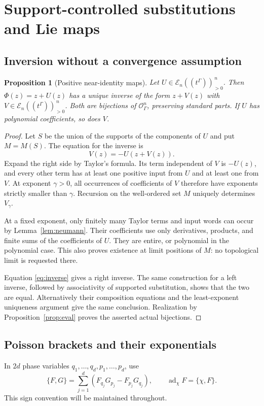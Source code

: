 \documentclass[11pt,letterpaper]{article}
\numberwithin{equation}{section}
\newtheorem{proposition}[theorem]{Proposition}
\theoremstyle{definition}
\theoremstyle{remark}
\newcommand{\E}{\mathscr E}
\newcommand{\OO}{\mathcal O}
\newcommand{\ad}{\operatorname{ad}}
\newcommand{\HH}[1]{#1((t^\Gamma))}
\begin{document}
\section{Support-controlled substitutions and Lie maps}
\label{sec:lie}

\subsection{Inversion without a convergence assumption}
\begin{proposition}[Positive near-identity maps]\label{prop:inverse}
Let $U\in\HH{\E_n}_{>0}^{\,n}$. Then $\Phi(z)=z+U(z)$ has a unique inverse
of the form $z+V(z)$ with $V\in\HH{\E_n}_{>0}^{\,n}$. Both are bijections
of $\OO_\Gamma^n$, preserving standard parts. If $U$ has polynomial
coefficients, so does $V$.
\end{proposition}
\begin{proof}
Let $S$ be the union of the supports of the components of $U$ and put
$M=M(S)$. The equation for the inverse is
\begin{equation}\label{eq:inverse}
 V(z)=-U(z+V(z)).
\end{equation}
Expand the right side by Taylor's formula. Its term independent of $V$ is
$-U(z)$, and every other term has at least one positive input from $U$ and at
least one from $V$. At exponent $\gamma>0$, all occurrences of coefficients
of $V$ therefore have exponents strictly smaller than $\gamma$. Recursion on
the well-ordered set $M$ uniquely determines $V_\gamma$.

At a fixed exponent, only finitely many Taylor terms and input words can
occur by Lemma~\ref{lem:neumann}. Their coefficients use only derivatives,
products, and finite sums of the coefficients of $U$. They are entire, or
polynomial in the polynomial case. This also proves existence at limit
positions of $M$: no topological limit is requested there.

Equation \eqref{eq:inverse} gives a right inverse. The same construction for
a left inverse, followed by associativity of supported substitution, shows
that the two are equal. Alternatively their composition equations and the
least-exponent uniqueness argument give the same conclusion. Realization
by Proposition~\ref{prop:eval} proves the asserted actual bijections.
\end{proof}

\subsection{Poisson brackets and their exponentials}
In $2d$ phase variables $q_1,\ldots,q_d,p_1,\ldots,p_d$, use
\begin{equation}\label{eq:pb}
 \{F,G\}=\sum_{j=1}^d
 (F_{q_j}G_{p_j}-F_{p_j}G_{q_j}),\qquad
 \ad_\chi F=\{\chi,F\}.
\end{equation}
This sign convention will be maintained throughout.
\end{document}
